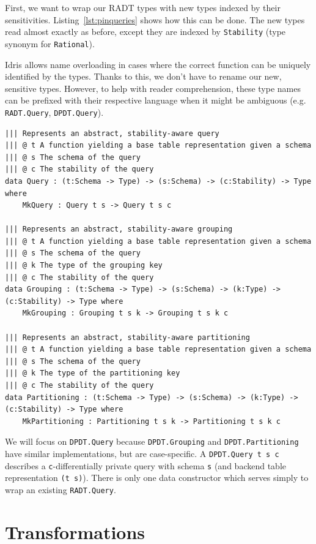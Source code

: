 \documentclass[12pt]{report}
\begin{document}
First, we want to wrap our RADT types with new types indexed by their sensitivities.
Listing~\ref{lst:pinqueries} shows how this can be done.
The new types read almost exactly as before, except they are indexed by \texttt{Stability} (type synonym for \texttt{Rational}).

Idris allows name overloading in cases where the correct function can be uniquely identified by the types.
Thanks to this, we don't have to rename our new, sensitive types.
However, to help with reader comprehension, these type names can be prefixed with their respective language when it might be ambiguous (e.g. \texttt{RADT.Query}, \texttt{DPDT.Query}).

\begin{lstlisting}[float,caption={Representing privacy-aware queries},label={lst:pinqueries}]
||| Represents an abstract, stability-aware query
||| @ t A function yielding a base table representation given a schema
||| @ s The schema of the query
||| @ c The stability of the query
data Query : (t:Schema -> Type) -> (s:Schema) -> (c:Stability) -> Type where
    MkQuery : Query t s -> Query t s c

||| Represents an abstract, stability-aware grouping
||| @ t A function yielding a base table representation given a schema
||| @ s The schema of the query
||| @ k The type of the grouping key
||| @ c The stability of the query
data Grouping : (t:Schema -> Type) -> (s:Schema) -> (k:Type) -> (c:Stability) -> Type where
    MkGrouping : Grouping t s k -> Grouping t s k c

||| Represents an abstract, stability-aware partitioning
||| @ t A function yielding a base table representation given a schema
||| @ s The schema of the query
||| @ k The type of the partitioning key
||| @ c The stability of the query
data Partitioning : (t:Schema -> Type) -> (s:Schema) -> (k:Type) -> (c:Stability) -> Type where
    MkPartitioning : Partitioning t s k -> Partitioning t s k c
\end{lstlisting}

We will focus on \texttt{DPDT.Query} because \texttt{DPDT.Grouping} and \texttt{DPDT.Partitioning} have similar implementations, but are case-specific.
A \texttt{DPDT.Query t s c} describes a \texttt{c}-differentially private query with schema \texttt{s} (and backend table representation \texttt{(t s)}).
There is only one data constructor which serves simply to wrap an existing \texttt{RADT.Query}.

\section{Transformations}
\end{document}
